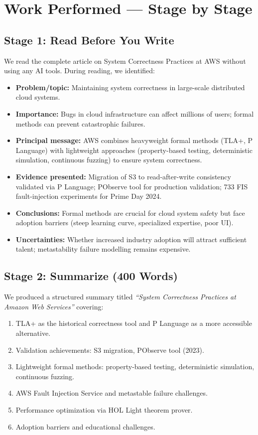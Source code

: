 \documentclass[11pt, a4paper]{article}
\begin{document}
\section{Work Performed --- Stage by Stage}

\subsection{Stage 1: Read Before You Write}
We read the complete article on System Correctness Practices at AWS without using any AI tools. During reading, we identified:
\begin{itemize}[nosep]
    \item \textbf{Problem/topic:} Maintaining system correctness in large-scale distributed cloud systems.
    \item \textbf{Importance:} Bugs in cloud infrastructure can affect millions of users; formal methods can prevent catastrophic failures.
    \item \textbf{Principal message:} AWS combines heavyweight formal methods (TLA+, P Language) with lightweight approaches (property-based testing, deterministic simulation, continuous fuzzing) to ensure system correctness.
    \item \textbf{Evidence presented:} Migration of S3 to read-after-write consistency validated via P Language; PObserve tool for production validation; 733 FIS fault-injection experiments for Prime Day 2024.
    \item \textbf{Conclusions:} Formal methods are crucial for cloud system safety but face adoption barriers (steep learning curve, specialized expertise, poor UI).
    \item \textbf{Uncertainties:} Whether increased industry adoption will attract sufficient talent; metastability failure modelling remains expensive.
\end{itemize}

\subsection{Stage 2: Summarize (400 Words)}
We produced a structured summary titled \textit{``System Correctness Practices at Amazon Web Services''} covering:
\begin{enumerate}[nosep]
    \item TLA+ as the historical correctness tool and P Language as a more accessible alternative.
    \item Validation achievements: S3 migration, PObserve tool (2023).
    \item Lightweight formal methods: property-based testing, deterministic simulation, continuous fuzzing.
    \item AWS Fault Injection Service and metastable failure challenges.
    \item Performance optimization via HOL Light theorem prover.
    \item Adoption barriers and educational challenges.
\end{enumerate}
\end{document}
